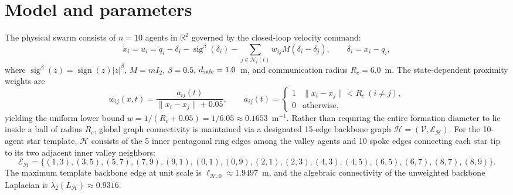 \documentclass[10pt]{article}
\begin{document}
\section{Model and parameters}
The physical swarm consists of $n = 10$ agents in $\mathbb{R}^2$ governed by the closed-loop velocity command:
\[
\dot x_i = u_i = \dot q_i - \delta_i - \operatorname{sig}^{\beta}(\delta_i)
- \sum_{j \in \mathcal{N}_i(t)} w_{ij} M (\delta_i - \delta_j), \qquad \delta_i = x_i - q_i,
\]
where $\operatorname{sig}^{\beta}(z) = \operatorname{sign}(z)|z|^{\beta}$, $M = m I_2$, $\beta = 0.5$, $d_{\rm safe} = 1.0$~m, and communication radius $R_c = 6.0$~m.
The state-dependent proximity weights are
\[
w_{ij}(x, t) = \frac{a_{ij}(t)}{\|x_i - x_j\| + 0.05}, \qquad
a_{ij}(t) = \begin{cases} 1 & \|x_i - x_j\| < R_c \ (i \neq j), \\ 0 & \text{otherwise}, \end{cases}
\]
yielding the uniform lower bound $\underline{w} = 1 / (R_c + 0.05) = 1/6.05 \approx 0.1653$~m$^{-1}$. Rather than requiring the entire formation diameter to lie inside a ball of radius $R_c$, global graph connectivity is maintained via a designated 15-edge backbone graph $\mathcal{H} = (\mathcal{V}, \mathcal{E}_{\mathcal{H}})$. For the 10-agent star template, $\mathcal{H}$ consists of the 5 inner pentagonal ring edges among the valley agents and 10 spoke edges connecting each star tip to its two adjacent inner valley neighbors:
\[
\mathcal{E}_{\mathcal{H}} = \{(1,3),(3,5),(5,7),(7,9),(9,1), (0,1),(0,9),(2,1),(2,3),(4,3),(4,5),(6,5),(6,7),(8,7),(8,9)\}.
\]
The maximum template backbone edge at unit scale is $\ell_{\mathcal{H},0} \approx 1.9497$~m, and the algebraic connectivity of the unweighted backbone Laplacian is $\lambda_2(L_{\mathcal{H}}) \approx 0.9316$.
\end{document}
